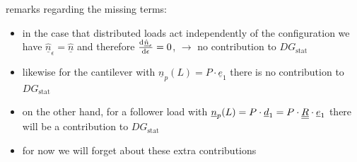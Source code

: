 \begin{frame}
  \vspace{1em}
  remarks regarding the missing terms:
  \begin{itemize}
    \item in the case that distributed loads act independently of the configuration we have $\underline{\hat{n}}_{\epsilon} = \underline{\hat{n}}$ and therefore $\od{\underline{\hat{n}}_{\epsilon}}{\epsilon} = 0$, $\rightarrow$ no contribution to $DG_{\text{stat}}$
    \item likewise for the cantilever with $\underline{n}_p(L) = P \cdot \underline{e}_1$ there is no contribution to $DG_{\text{stat}}$
    \item on the other hand, for a follower load with $\underline{n}_p(L) = P \cdot \underline{d}_1 = P \cdot \underline{\underline{R}} \cdot \underline{e}_1$ there will be a contribution to $DG_{\text{stat}}$
    \item for now we will forget about these extra contributions
  \end{itemize}
  
  
  
\end{frame}


